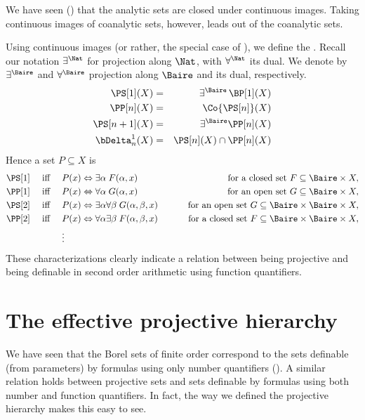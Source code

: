 \documentclass[letterpaper,10pt,english]{jupyterBook}
\begin{document}
\sphinxAtStartPar
We have seen ({\hyperref[\detokenize{analytic:prop-prop-analytic}]{}}) that the analytic sets are closed under continuous images. Taking continuous images of co\sphinxhyphen{}analytic sets, however, leads out of the co\sphinxhyphen{}analytic sets.

\sphinxAtStartPar
Using continuous images (or rather, the special case of ), we define the . Recall our notation \(\exists^\Nat\) for projection along \(\Nat\), with \(\forall^\Nat\) its dual. We denote by \(\exists^{\Baire}\) and \(\forall^{\Baire}\) projection along \(\Baire\) and its dual, respectively.
\begin{eqnarray*}
 \PS[1](X) &=& \exists^{\Baire} \, \BP[1](X) \\
 \PP[n](X) &=& \Co{\PS[n]}(X)  \\
 \PS[n+1](X) &=& \exists^{\Baire} \PP[n](X) \\
 \bDelta^1_n(X) &=& \PS[n](X) \cap \PP[n](X) \\
\end{eqnarray*}
\sphinxAtStartPar
Hence a set \(P\subseteq X\) is
\begin{align*}
\PS[1]  \quad \text{ iff } \quad & P(x) \Leftrightarrow \exists \alpha \; F(\alpha,x)  \qquad & \text{ for a closed set  } F \subseteq \Baire \times X, \\
\PP[1] \quad \text{ iff } \quad &  P(x) \Leftrightarrow \forall \alpha \; G(\alpha,x)  \qquad & \text{ for an open set  } G \subseteq \Baire \times X, \\
\PS[2] \quad \text{ iff } \quad &  P(x) \Leftrightarrow \exists \alpha \forall \beta \; G(\alpha,\beta,x)  \qquad & \text{ for an open set  } G \subseteq \Baire \times \Baire \times X, \\
\PP[2]  \quad \text{ iff } \quad &  P(x) \Leftrightarrow \forall \alpha \exists \beta \; F(\alpha,\beta, x)  \qquad & \text{ for a closed set  } F \subseteq \Baire \times \Baire \times X, \\
& \vdots
\end{align*}
\sphinxAtStartPar
These characterizations clearly indicate a relation between being projective and being definable in second order arithmetic using function quantifiers.


\section{The effective projective hierarchy}
\label{\detokenize{projective:the-effective-projective-hierarchy}}
\sphinxAtStartPar
We have seen that the Borel sets of finite order correspond to the sets definable (from parameters) by formulas using only number quantifiers (). A similar relation holds between projective sets and sets definable by formulas using both number and function quantifiers. In fact, the way we defined the projective hierarchy makes this easy to see.
\end{document}
